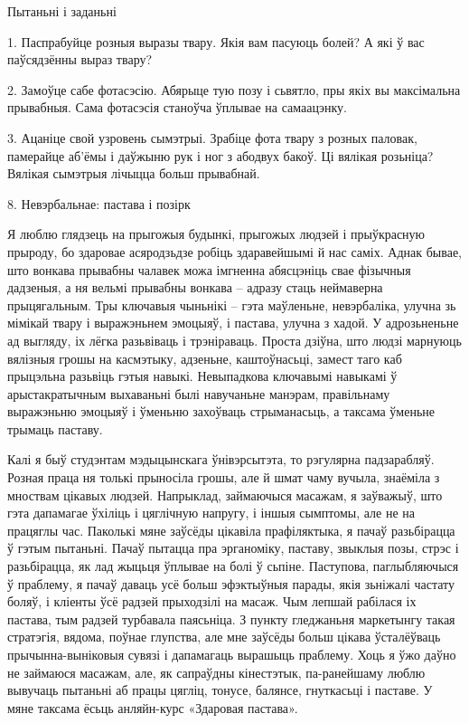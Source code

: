 Пытаньні і заданьні

1. Паспрабуйце розныя выразы твару. Якія вам пасуюць болей? А які ў вас паўсядзённы выраз твару?

2. Замоўце сабе фотасэсію. Абярыце тую позу і сьвятло, пры якіх вы максімальна прывабныя. Сама фотасэсія станоўча ўплывае на самаацэнку.

3. Ацаніце свой узровень сымэтрыі. Зрабіце фота твару з розных паловак, памерайце аб'ёмы і даўжыню рук і ног з абодвух бакоў. Ці вялікая розьніца? Вялікая сымэтрыя лічыцца больш прывабнай.


8. Невэрбальнае: пастава і позірк

Я люблю глядзець на прыгожыя будынкі, прыгожых людзей і прыўкрасную прыроду, бо здаровае асяродзьдзе робіць здаравейшымі й нас саміх. Аднак бывае, што вонкава прывабны чалавек можа імгненна абясцэніць свае фізычныя дадзеныя, а ня вельмі прывабны вонкава – адразу стаць неймаверна прыцягальным. Тры ключавыя чыньнікі – гэта маўленьне, невэрбаліка, улучна зь мімікай твару і выражэньнем эмоцыяў, і пастава, улучна з хадой. У адрозьненьне ад выгляду, іх лёгка разьвіваць і трэніраваць. Проста дзіўна, што людзі марнуюць вялізныя грошы на касмэтыку, адзеньне, каштоўнасьці, замест таго каб прыцэльна разьвіць гэтыя навыкі. Невыпадкова ключавымі навыкамі ў арыстакратычным выхаваньні былі навучаньне манэрам, правільнаму выражэньню эмоцыяў і ўменьню захоўваць стрыманасьць, а таксама ўменьне трымаць паставу.

Калі я быў студэнтам мэдыцынскага ўнівэрсытэта, то рэгулярна падзарабляў. Розная праца ня толькі прыносіла грошы, але й шмат чаму вучыла, знаёміла з мноствам цікавых людзей. Напрыклад, займаючыся масажам, я заўважыў, што гэта дапамагае ўхіліць і цяглічную напругу, і іншыя сымптомы, але не на працяглы час. Паколькі мяне заўсёды цікавіла прафіляктыка, я пачаў разьбірацца ў гэтым пытаньні. Пачаў пытацца пра эрганоміку, паставу, звыклыя позы, стрэс і разьбірацца, як лад жыцьця ўплывае на болі ў сьпіне. Паступова, паглыбляючыся ў праблему, я пачаў даваць усё больш эфэктыўныя парады, якія зьніжалі частату боляў, і кліенты ўсё радзей прыходзілі на масаж. Чым лепшай рабілася іх пастава, тым радзей турбавала паясьніца. З пункту гледжаньня маркетынгу такая стратэгія, вядома, поўнае глупства, але мне заўсёды больш цікава ўсталёўваць прычынна-выніковыя сувязі і дапамагаць вырашыць праблему. Хоць я ўжо даўно не займаюся масажам, але, як сапраўдны кінестэтык, па-ранейшаму люблю вывучаць пытаньні аб працы цягліц, тонусе, балянсе, гнуткасьці і паставе. У мяне таксама ёсьць анляйн-курс «Здаровая пастава».

